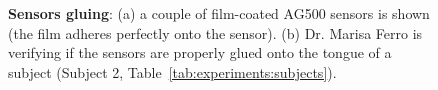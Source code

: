 \begin{figure}
	\centering
		\hspace{0.05\textwidth}

	\caption[Sensors gluing]{\textbf{Sensors gluing}:
	(a) a couple of film-coated AG500 sensors is shown (the film adheres
	perfectly onto the sensor). (b) Dr. Marisa Ferro is verifying if the sensors
	are properly glued onto the tongue of a subject (Subject 2,
	Table~\ref{tab:experiments:subjects}).}
	\label{fig:experiments:glue}
\end{figure}
